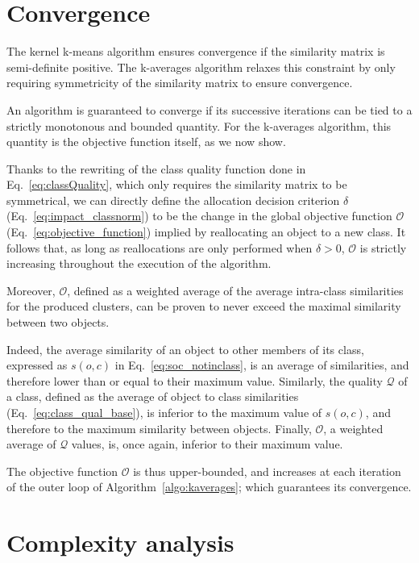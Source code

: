 \documentclass[10pt,letterpaper]{article}
\begin{document}
\section{Convergence}
\label{sec:convergence}

The kernel k-means algorithm ensures convergence if the similarity matrix is semi-definite positive. The k-averages algorithm relaxes this constraint by only requiring symmetricity of the similarity matrix to ensure convergence.

An algorithm is guaranteed to converge if its successive iterations can be tied to a strictly monotonous and bounded quantity. For the k-averages algorithm, this quantity is the objective function itself, as we now show.

Thanks to the rewriting of the class quality function done in Eq.~\ref{eq:classQuality}, which only requires the similarity matrix to be symmetrical, we can directly define the allocation decision criterion $\delta$ (Eq.~\ref{eq:impact_classnorm}) to be the change in the global objective function $\mathcal{O}$ (Eq.~\ref{eq:objective_function}) implied by reallocating an object to a new class. It follows that, as long as reallocations are only performed when $\delta > 0$, $\mathcal{O}$ is strictly increasing throughout the execution of the algorithm.

Moreover, $\mathcal{O}$, defined as a weighted average of the average intra-class similarities for the produced clusters, can be proven to never exceed the maximal similarity between two objects.

Indeed, the average similarity of an object to other members of its class, expressed as $s(o,c)$ in Eq.~\ref{eq:soc_notinclass}, is an average of similarities, and therefore lower than or equal to their maximum value. Similarly, the quality $\mathcal{Q}$ of a class, defined as the average of object to class similarities (Eq.~\ref{eq:class_qual_base}), is inferior to the maximum value of $s(o,c)$, and therefore to the maximum similarity between objects. Finally, $\mathcal{O}$, a weighted average of $\mathcal{Q}$ values, is, once again, inferior to their maximum value.

The objective function $\mathcal{O}$ is thus upper-bounded, and increases at each iteration of the outer loop of Algorithm~\ref{algo:kaverages}; which guarantees its convergence.

\section{Complexity analysis}
\label{sec:complexity}
\end{document}
